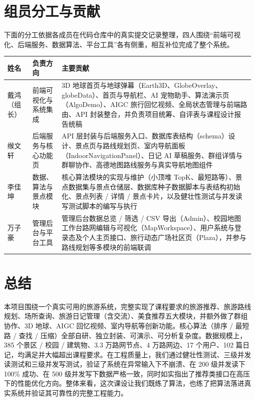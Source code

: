 \documentclass[UTF8,a4paper,12pt]{ctexart}
\begin{document}
\section{组员分工与贡献}

下面的分工依据各成员在代码仓库中的真实提交记录整理，四人围绕“前端可视化、后端服务、数据算法、平台工具”各有侧重，相互补位完成了整个系统。

\begin{longtable}{p{2cm}p{3.6cm}p{7.4cm}}
\toprule
\textbf{姓名} & \textbf{负责方向} & \textbf{主要贡献} \\
\midrule
\endhead
戴鸿（组长） & 前端可视化与系统集成 & 3D 地球首页与地球弹幕（Earth3D、GlobeOverlay、globeData）、首页与导航栏、AI 宠物助手、算法演示页（AlgoDemo）、AIGC 旅行回忆视频、全局状态管理与前端路由、API 封装整合，并负责项目统筹、自评表与课程设计报告统稿 \\
缑文轩 & 后端服务与核心功能页 & API 层封装与后端服务入口、数据库表结构（schema）设计、景点页与路线规划页、室内导航面板（IndoorNavigationPanel）、日记 AI 草稿服务、群组详情与群聊协作、高德地图路线服务与真实导航地图组件 \\
李佳坤 & 数据、算法与景点模块 & 核心算法模块的实现与维护（小顶堆 TopK、最短路等）、景点数据集与景点仓储层、数据库种子数据脚本与表结构初始化、景点列表 / 详情 / 景点卡片，以及健壮性测试与并发读写测试脚本的编写与执行 \\
万子豪 & 管理后台与平台工具 & 管理后台数据总览 / 筛选 / CSV 导出（Admin）、校园地图工作台路网编辑与可视化（MapWorkspace）、用户系统与登录态及个人主页接口、旅行动态广场社区页（Plaza），并参与路线规划等多模块的前端联调 \\
\bottomrule
\end{longtable}

\section{总结}

本项目围绕一个真实可用的旅游系统，完整实现了课程要求的旅游推荐、旅游路线规划、场所查询、旅游日记管理（含交流）、美食推荐五大模块，并额外做了群组协作、3D 地球、AIGC 回忆视频、室内导航等创新功能。核心算法（排序 / 最短路 / 查找 / 压缩）全部自研、独立封装、可演示、可分析复杂度。数据规模上，385 个景区 / 校园 / 建筑物、3.3 万路网节点、4 万路网边、17 个用户、102 篇日记，均满足并大幅超出课程要求。在工程质量上，我们通过健壮性测试、三级并发读测试和三级并发写测试，验证了系统在异常输入下不崩溃、在 200 级并发读下 100\% 成功、在 500 级并发写下数据严格一致，同时如实指出了推荐类接口在高压下的性能优化方向。整体来看，这次课设让我们既练了算法，也练了把算法落进真实系统并验证其可靠性的完整工程能力。
\end{document}
